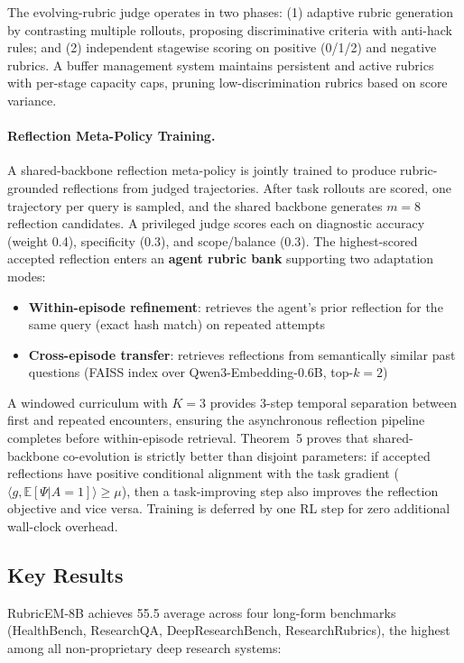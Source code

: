 \documentclass[11pt,a4paper]{article}
\begin{document}
The evolving-rubric judge operates in two phases: (1) adaptive rubric generation by contrasting multiple rollouts, proposing discriminative criteria with anti-hack rules; and (2) independent stagewise scoring on positive (0/1/2) and negative rubrics. A buffer management system maintains persistent and active rubrics with per-stage capacity caps, pruning low-discrimination rubrics based on score variance.

\paragraph{Reflection Meta-Policy Training.}
A shared-backbone reflection meta-policy is jointly trained to produce rubric-grounded reflections from judged trajectories. After task rollouts are scored, one trajectory per query is sampled, and the shared backbone generates $m{=}8$ reflection candidates. A privileged judge scores each on diagnostic accuracy (weight 0.4), specificity (0.3), and scope/balance (0.3). The highest-scored accepted reflection enters an \textbf{agent rubric bank} supporting two adaptation modes:
\begin{itemize}[nosep]
\item \textbf{Within-episode refinement}: retrieves the agent's prior reflection for the same query (exact hash match) on repeated attempts
\item \textbf{Cross-episode transfer}: retrieves reflections from semantically similar past questions (FAISS index over Qwen3-Embedding-0.6B, top-$k{=}2$)
\end{itemize}
A windowed curriculum with $K{=}3$ provides 3-step temporal separation between first and repeated encounters, ensuring the asynchronous reflection pipeline completes before within-episode retrieval. Theorem~5 proves that shared-backbone co-evolution is strictly better than disjoint parameters: if accepted reflections have positive conditional alignment with the task gradient ($\langle g, \mathbb{E}[\Psi | A{=}1]\rangle \geq \mu$), then a task-improving step also improves the reflection objective and vice versa. Training is deferred by one RL step for zero additional wall-clock overhead.

\subsection{Key Results}

RubricEM-8B achieves 55.5 average across four long-form benchmarks (HealthBench, ResearchQA, DeepResearchBench, ResearchRubrics), the highest among all non-proprietary deep research systems:
\end{document}
